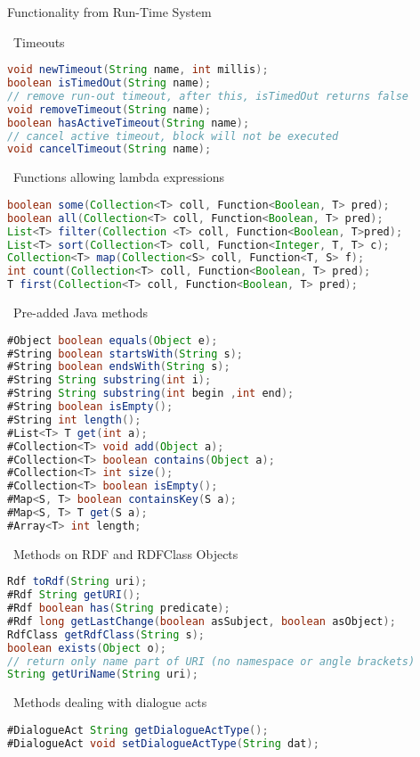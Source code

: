 \documentclass[5pt]{article}
\newcommand{\intitle}[1]{\rule{0pt}{2ex}\ #1}
\begin{document}
\begin{multicols}{2}
\begin{bodybox}{Functionality from Run-Time System}
        \end{bodybox}
        \begin{bodybox}{}
        \intitle{Timeouts}
        \begin{lstlisting}[language=Java]
void newTimeout(String name, int millis);
boolean isTimedOut(String name);
// remove run-out timeout, after this, isTimedOut returns false
void removeTimeout(String name);
boolean hasActiveTimeout(String name);
// cancel active timeout, block will not be executed
void cancelTimeout(String name);
        \end{lstlisting}
        \intitle{Functions allowing lambda expressions}
        \begin{lstlisting}[language=Java]
boolean some(Collection<T> coll, Function<Boolean, T> pred);
boolean all(Collection<T> coll, Function<Boolean, T> pred);
List<T> filter(Collection <T> coll, Function<Boolean, T>pred);
List<T> sort(Collection<T> coll, Function<Integer, T, T> c);
Collection<T> map(Collection<S> coll, Function<T, S> f);
int count(Collection<T> coll, Function<Boolean, T> pred);
T first(Collection<T> coll, Function<Boolean, T> pred);
        \end{lstlisting}
        \intitle{Pre-added Java methods}
        \begin{lstlisting}[language=Java]
#Object boolean equals(Object e);
#String boolean startsWith(String s);
#String boolean endsWith(String s);
#String String substring(int i);
#String String substring(int begin ,int end);
#String boolean isEmpty();
#String int length();
#List<T> T get(int a);
#Collection<T> void add(Object a);
#Collection<T> boolean contains(Object a);
#Collection<T> int size();
#Collection<T> boolean isEmpty();
#Map<S, T> boolean containsKey(S a);
#Map<S, T> T get(S a);
#Array<T> int length;
        \end{lstlisting}
        \intitle{Methods on RDF and RDFClass Objects}
        \begin{lstlisting}[language=Java]
Rdf toRdf(String uri);
#Rdf String getURI();
#Rdf boolean has(String predicate);
#Rdf long getLastChange(boolean asSubject, boolean asObject);
RdfClass getRdfClass(String s);
boolean exists(Object o);
// return only name part of URI (no namespace or angle brackets)
String getUriName(String uri);
        \end{lstlisting}
        \intitle{Methods dealing with dialogue acts}
        \begin{lstlisting}[language=Java]
#DialogueAct String getDialogueActType();
#DialogueAct void setDialogueActType(String dat);

\end{lstlisting}
\end{bodybox}
\end{multicols}
\end{document}
